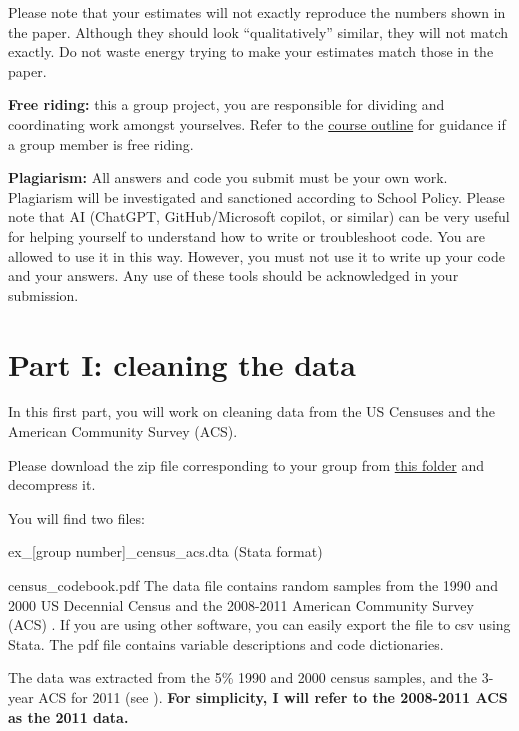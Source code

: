 \documentclass[a4paper, 11pt,addpoints,answers]{exam}
\begin{document}
\item Please note that your estimates will not exactly reproduce the numbers shown in the paper. Although they should look ``qualitatively'' similar, they will not match exactly. Do not waste energy trying to make your estimates match those in the paper.
\item \textbf{Free riding:} this a group project, you are responsible for dividing and coordinating work amongst yourselves. Refer to the \href{https://www.learn.ed.ac.uk/ultra/courses/_121272_1/outline/edit/document/_10205264_1?courseId=_121272_1&view=content}{course outline} for guidance if a group member is free riding.
\item \textbf{Plagiarism:} All answers and code you submit must be your own work. Plagiarism will be investigated and sanctioned according to School Policy. Please note that AI (ChatGPT, GitHub/Microsoft copilot, or similar) can be very useful for helping yourself to understand how to write or troubleshoot code. You are allowed to use it in this way. However, you must not use it to write up your code and your answers. Any use of these tools should be acknowledged in your submission.
\eitem 
\newpage 
\section*{Part I: cleaning the data}
\noindent In this first part, you will work on cleaning  data from the US Censuses and the American Community Survey (ACS).
\bitem
	\item Please download the zip file corresponding to your group from \href{https://www.dropbox.com/scl/fo/g2xtn0yymiebz0wivfe7k/AGwxkhhcV-4sBT43u8ZHYL4?rlkey=a8g768pa9m9v067bg9pudg10h&dl=0}{this folder} and decompress it.
	\item You will find two files:
	\bitem 
		\item ex\_[group number]\_census\_acs.dta (Stata format)
		\item census\_codebook.pdf
	\eitem 
	The data file contains random samples from the 1990 and 2000 US Decennial Census and the 2008-2011 American Community Survey (ACS) \citep{IPUMS}. If you are using other software, you can easily export the file to csv using Stata. The pdf file contains variable descriptions and code dictionaries.
	
	The data was extracted from the 5\% 1990 and 2000 census samples, and the 3-year ACS for 2011 (see ). \textbf{For simplicity, I will refer to the 2008-2011 ACS as the 2011 data.}
	
\end{document}
